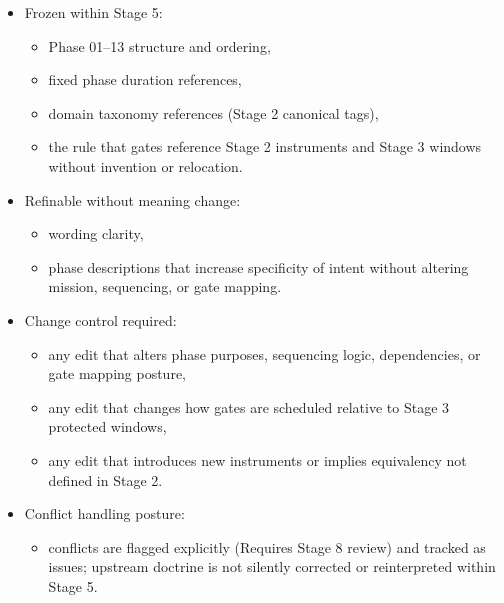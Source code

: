 \documentclass[10pt]{article}
\begin{document}
\begin{itemize}
\item Frozen within Stage 5:
  \begin{itemize}
  \item Phase 01–13 structure and ordering,
  \item fixed phase duration references,
  \item domain taxonomy references (Stage 2 canonical tags),
  \item the rule that gates reference Stage 2 instruments and Stage 3 windows without invention or relocation.
  \end{itemize}
\item Refinable without meaning change:
  \begin{itemize}
  \item wording clarity,
  \item phase descriptions that increase specificity of intent without altering mission, sequencing, or gate mapping.
  \end{itemize}
\item Change control required:
  \begin{itemize}
  \item any edit that alters phase purposes, sequencing logic, dependencies, or gate mapping posture,
  \item any edit that changes how gates are scheduled relative to Stage 3 protected windows,
  \item any edit that introduces new instruments or implies equivalency not defined in Stage 2.
  \end{itemize}
\item Conflict handling posture:
  \begin{itemize}
  \item conflicts are flagged explicitly (Requires Stage 8 review) and tracked as issues; upstream doctrine is not silently corrected or reinterpreted within Stage 5.
  \end{itemize}
\end{itemize}
\end{document}
